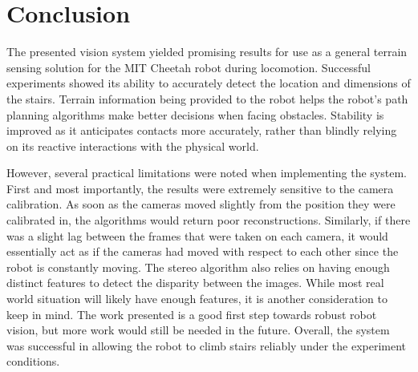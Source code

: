 
\section{Conclusion}

The presented vision system yielded promising results for use as a general terrain sensing solution for the MIT Cheetah robot during locomotion. Successful experiments showed its ability to accurately detect the location and dimensions of the stairs. Terrain information being provided to the robot helps the robot's path planning algorithms make better decisions when facing obstacles. Stability is improved as it anticipates contacts more accurately, rather than blindly relying on its reactive interactions with the physical world.

However, several practical limitations were noted when implementing the system. First and most importantly, the results were extremely sensitive to the camera calibration. As soon as the cameras moved slightly from the position they were calibrated in, the algorithms would return poor reconstructions. Similarly, if there was a slight lag between the frames that were taken on each camera, it would essentially act as if the cameras had moved with respect to each other since the robot is constantly moving. The stereo algorithm also relies on having enough distinct features to detect the disparity between the images. While most real world situation will likely have enough features, it is another consideration to keep in mind. The work presented is a good first step towards robust robot vision, but more work would still be needed in the future. Overall, the system was successful in allowing the robot to climb stairs reliably under the experiment conditions.